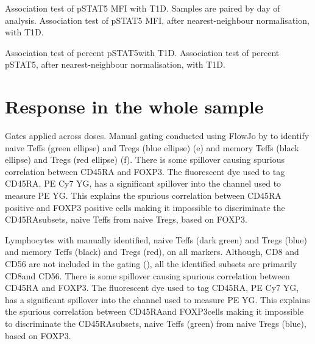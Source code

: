 
{ Association test of pSTAT5 MFI with T1D. }
{
  Samples are paired by day of analysis.
}
{ Association test of pSTAT5 MFI, after nearest-neighbour normalisation, with T1D. }
{ }
{ }

{ Association test of percent pSTAT5\positive with T1D. }
{ }
{ Association test of percent pSTAT5\positive, after nearest-neighbour normalisation, with T1D. }
{ } 


\section{Response in the whole sample}

{ Gates applied across doses. }
{
Manual gating conducted using FlowJo by  to identify
naive Teffs (green ellipse) and Tregs (blue ellipse) (e)
and memory Teffs (black ellipse) and Tregs (red ellipse) (f).
There is some spillover causing spurious correlation between CD45RA and FOXP3.
The fluorescent dye used to tag CD45RA, PE Cy7 YG, has a significant spillover into the channel used to measure PE YG.
This explains the spurious correlation between CD45RA positive and FOXP3 positive cells making it impossible to discriminate
the CD45RA\positive subsets, naive Teffs from naive Tregs, based on FOXP3.
}

{ Lymphocytes with manually identified, naive Teffs (dark green) and Tregs (blue) and memory Teffs (black) and Tregs (red), on all markers.  }
{
    Although, CD8 and CD56 are not included in the gating (), all the identified subsets are primarily CD8\negative and CD56\positive.
    There is some spillover causing spurious correlation between CD45RA and FOXP3.
    The fluorescent dye used to tag CD45RA, PE Cy7 YG, has a significant spillover into the channel used to measure PE YG.
    This explains the spurious correlation between CD45RA\positive and FOXP3\positive cells making it impossible to discriminate
    the CD45RA\positive subsets, naive Teffs (green) from naive Tregs (blue), based on FOXP3.  
}

